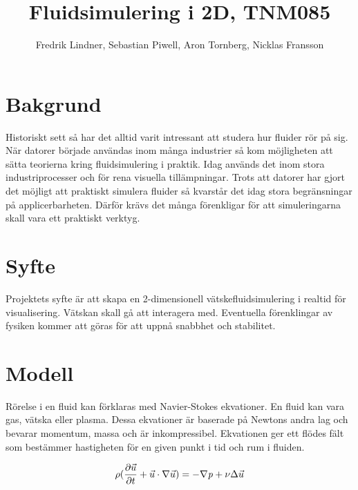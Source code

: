 \documentclass[a4paper,12pt,oneside,final]{extarticle}
\author{Fredrik Lindner, Sebastian Piwell, Aron Tornberg, Nicklas Fransson}
\title{Fluidsimulering i 2D, TNM085}
\begin{document}
\maketitle


\clearpage
\tableofcontents
\clearpage

\section{Bakgrund}
Historiskt sett så har det alltid varit intressant att studera hur fluider rör på sig.
När datorer började användas inom många industrier så kom möjligheten att sätta teorierna kring fluidsimulering i praktik.
Idag används det inom stora industriprocesser och för rena visuella tillämpningar.
Trots att datorer har gjort det möjligt att praktiskt simulera fluider så kvarstår det idag stora begränsningar på applicerbarheten.
Därför krävs det många förenkligar för att simuleringarna skall vara ett praktiskt verktyg.

\section{Syfte}
Projektets syfte är att skapa en 2-dimensionell vätskefluidsimulering i realtid för visualisering.
Vätskan skall gå att interagera med.
Eventuella förenklingar av fysiken kommer att göras för att uppnå snabbhet och stabilitet.

\clearpage

\section{Modell}
Rörelse i en fluid kan förklaras med Navier-Stokes ekvationer.
En fluid kan vara gas, vätska eller plasma.
Dessa ekvationer är baserade på Newtons andra lag och bevarar momentum, massa och är inkompressibel.
Ekvationen ger ett flödes fält som bestämmer hastigheten för en given punkt i tid och rum i fluiden.



\begin{equation} \label{eq:navier-stokes-1}
\rho(\frac{\partial \vec{u}}{\partial t} + \vec{u} \cdot \nabla \vec{u}) =  -\nabla {\it p} + \nu \Delta \vec{u}
\end{equation}
\end{document}
